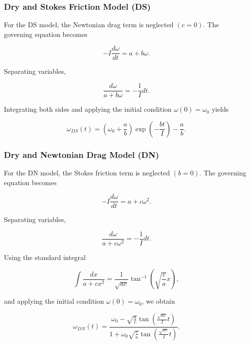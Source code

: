 \documentclass[11pt,letterpaper]{article}
\begin{document}
\subsubsection{Dry and Stokes Friction Model (DS)}

For the DS model, the Newtonian drag term is neglected $(c=0)$. The governing equation becomes

\begin{equation}
-I\frac{d\omega}{dt}=a+b\omega.
\end{equation}

Separating variables,

\begin{equation}
\frac{d\omega}{a+b\omega}
=
-\frac{1}{I}dt.
\end{equation}

Integrating both sides and applying the initial condition $\omega(0)=\omega_0$ yields

\begin{equation}
\boxed{
\omega_{DS}(t)
=
\left(\omega_0+\frac{a}{b}\right)
\exp\left(-\frac{bt}{I}\right)
-\frac{a}{b}
}.
\end{equation}

\subsubsection{Dry and Newtonian Drag Model (DN)}

For the DN model, the Stokes friction term is neglected $(b=0)$. The governing equation becomes

\begin{equation}
-I\frac{d\omega}{dt}
=
a+c\omega^2.
\end{equation}

Separating variables,

\begin{equation}
\frac{d\omega}{a+c\omega^2}
=
-\frac{1}{I}dt.
\end{equation}

Using the standard integral

\begin{equation}
\int\frac{dx}{a+cx^2}
=
\frac{1}{\sqrt{ac}}
\tan^{-1}
\left(
\sqrt{\frac{c}{a}}x
\right),
\end{equation}

and applying the initial condition $\omega(0)=\omega_0$, we obtain

\begin{equation}
\boxed{
\omega_{DN}(t)
=
\frac{
\omega_0
-
\sqrt{\frac{a}{c}}
\tan\!\left(\frac{\sqrt{ac}}{I}t\right)
}
{
1+
\omega_0
\sqrt{\frac{c}{a}}
\tan\!\left(\frac{\sqrt{ac}}{I}t\right)
}
}.
\end{equation}
\end{document}
